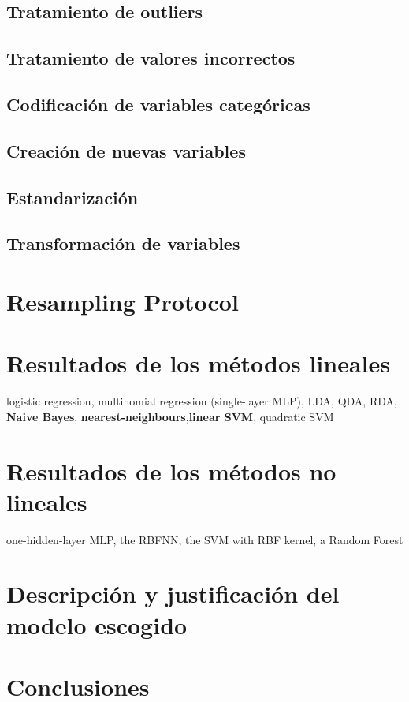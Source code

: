 \documentclass[a4paper]{article}
\begin{document}
\subsection{Tratamiento de outliers}

\subsection{Tratamiento de valores incorrectos}

\subsection{Codificación de variables categóricas}


\subsection{Creación de nuevas variables}

\subsection{Estandarización}

\subsection{Transformación de variables}

\section{Resampling Protocol}

\section{Resultados de los métodos lineales}
logistic regression, multinomial regression
(single-layer MLP), LDA, QDA, RDA, \textbf{Naive Bayes}, \textbf{nearest-neighbours},\textbf{linear SVM}, quadratic SVM
\section{Resultados de los métodos no lineales}
one-hidden-layer MLP, the RBFNN, the SVM with RBF kernel, a
Random Forest
\section{Descripción y justificación del modelo escogido}

\section{Conclusiones}
\end{document}
